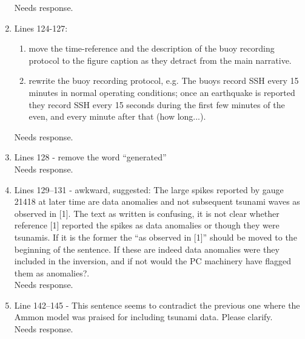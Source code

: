 \documentclass[]{article}
\newcommand{\alert}[1]{{\color{red} #1}}
\begin{document}
\begin{enumerate}
\alert{Needs response.} \\

\item Lines 124-127:
\begin{enumerate}
    \item move the time-reference and the description of the buoy recording protocol to the figure caption as they detract from the main narrative.
    \item rewrite the buoy recording protocol, e.g.  The buoys record SSH every 15 minutes in normal operating conditions; once an earthquake is reported they record SSH every 15 seconds during the first few minutes of the even, and every minute after that (how long...).
\end{enumerate}

\alert{Needs response.} \\

\item Lines 128 - remove the word ``generated'' \\

\alert{Needs response.} \\

\item Lines 129–131 - awkward, suggested:  The large spikes reported by gauge 21418 at later time are data anomalies and not subsequent tsunami waves as observed in [1].  The text as written is confusing, it is not clear whether reference [1] reported the spikes as data anomalies or though they were tsunamis. If it is the former the ``as observed in [1]'' should be moved to the beginning of the sentence.  If these are indeed data anomalies were they included in the inversion, and if not would the PC machinery have flagged them as anomalies?. \\

\alert{Needs response.} \\

\item Line 142–145 - This sentence seems to contradict the previous one where the Ammon model was praised for including tsunami data. Please clarify. \\

\alert{Needs response.} \\


\end{enumerate}
\end{document}
